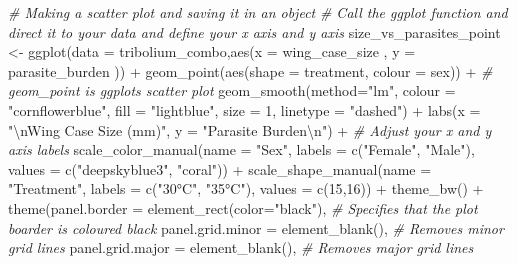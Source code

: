 \documentclass[
]{book}
\newenvironment{Shaded}{\begin{snugshade}}{\end{snugshade}}
\newcommand{\AttributeTok}[1]{\textcolor[rgb]{0.77,0.63,0.00}{#1}}
\newcommand{\CommentTok}[1]{\textcolor[rgb]{0.56,0.35,0.01}{\textit{#1}}}
\newcommand{\DecValTok}[1]{\textcolor[rgb]{0.00,0.00,0.81}{#1}}
\newcommand{\FunctionTok}[1]{\textcolor[rgb]{0.00,0.00,0.00}{#1}}
\newcommand{\NormalTok}[1]{#1}
\newcommand{\OtherTok}[1]{\textcolor[rgb]{0.56,0.35,0.01}{#1}}
\newcommand{\SpecialCharTok}[1]{\textcolor[rgb]{0.00,0.00,0.00}{#1}}
\newcommand{\StringTok}[1]{\textcolor[rgb]{0.31,0.60,0.02}{#1}}
\begin{document}
\begin{Shaded}
\begin{Highlighting}[]
\CommentTok{\# Making a scatter plot and saving it in an object}
\CommentTok{\# Call the ggplot function and direct it to your data and define your x axis and y axis}
\NormalTok{size\_vs\_parasites\_point }\OtherTok{\textless{}{-}} \FunctionTok{ggplot}\NormalTok{(}\AttributeTok{data =}\NormalTok{ tribolium\_combo,}\FunctionTok{aes}\NormalTok{(}\AttributeTok{x =}\NormalTok{ wing\_case\_size , }\AttributeTok{y =}\NormalTok{ parasite\_burden )) }\SpecialCharTok{+} 
  \FunctionTok{geom\_point}\NormalTok{(}\FunctionTok{aes}\NormalTok{(}\AttributeTok{shape =}\NormalTok{ treatment, }\AttributeTok{colour =}\NormalTok{ sex)) }\SpecialCharTok{+} \CommentTok{\# geom\_point is ggplots scatter plot}
  \FunctionTok{geom\_smooth}\NormalTok{(}\AttributeTok{method=}\StringTok{"lm"}\NormalTok{, }\AttributeTok{colour =} \StringTok{"cornflowerblue"}\NormalTok{, }\AttributeTok{fill =} \StringTok{"lightblue"}\NormalTok{, }\AttributeTok{size =} \DecValTok{1}\NormalTok{, }\AttributeTok{linetype =} \StringTok{"dashed"}\NormalTok{) }\SpecialCharTok{+}
  \FunctionTok{labs}\NormalTok{(}\AttributeTok{x =} \StringTok{"}\SpecialCharTok{\textbackslash{}n}\StringTok{Wing Case Size (mm)"}\NormalTok{, }\AttributeTok{y =} \StringTok{"Parasite Burden}\SpecialCharTok{\textbackslash{}n}\StringTok{"}\NormalTok{) }\SpecialCharTok{+} \CommentTok{\# Adjust your x and y axis labels }
  \FunctionTok{scale\_color\_manual}\NormalTok{(}\AttributeTok{name =} \StringTok{"Sex"}\NormalTok{, }\AttributeTok{labels =} \FunctionTok{c}\NormalTok{(}\StringTok{"Female"}\NormalTok{, }\StringTok{"Male"}\NormalTok{), }\AttributeTok{values =} \FunctionTok{c}\NormalTok{(}\StringTok{"deepskyblue3"}\NormalTok{, }\StringTok{"coral"}\NormalTok{)) }\SpecialCharTok{+}
  \FunctionTok{scale\_shape\_manual}\NormalTok{(}\AttributeTok{name =} \StringTok{"Treatment"}\NormalTok{, }\AttributeTok{labels =} \FunctionTok{c}\NormalTok{(}\StringTok{"30°C"}\NormalTok{, }\StringTok{"35°C"}\NormalTok{), }\AttributeTok{values =} \FunctionTok{c}\NormalTok{(}\DecValTok{15}\NormalTok{,}\DecValTok{16}\NormalTok{)) }\SpecialCharTok{+}
  \FunctionTok{theme\_bw}\NormalTok{() }\SpecialCharTok{+}
  \FunctionTok{theme}\NormalTok{(}\AttributeTok{panel.border =} \FunctionTok{element\_rect}\NormalTok{(}\AttributeTok{color=}\StringTok{"black"}\NormalTok{), }\CommentTok{\# Specifies that the plot boarder is coloured black}
        \AttributeTok{panel.grid.minor =} \FunctionTok{element\_blank}\NormalTok{(), }\CommentTok{\# Removes minor grid lines }
        \AttributeTok{panel.grid.major =} \FunctionTok{element\_blank}\NormalTok{(), }\CommentTok{\# Removes major grid lines }

\end{Highlighting}
\end{Shaded}
\end{document}
